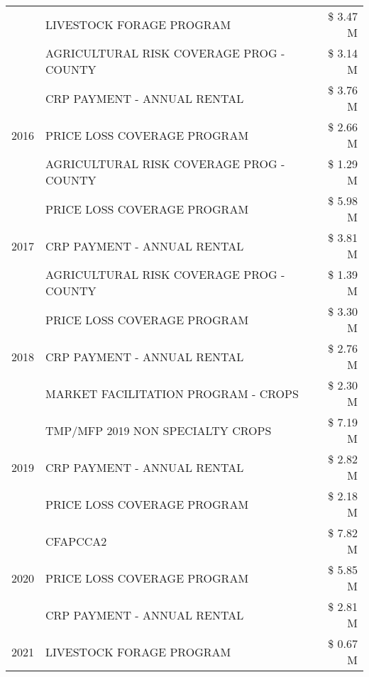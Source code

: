\begin{tabular}{llr}
 & LIVESTOCK FORAGE PROGRAM & \$ 3.47 M \\
 & AGRICULTURAL RISK COVERAGE PROG - COUNTY & \$ 3.14 M \\
\cline{1-3}
\multirow[t]{3}{*}{2016} & CRP PAYMENT - ANNUAL RENTAL & \$ 3.76 M \\
 & PRICE LOSS COVERAGE PROGRAM & \$ 2.66 M \\
 & AGRICULTURAL RISK COVERAGE PROG - COUNTY & \$ 1.29 M \\
\cline{1-3}
\multirow[t]{3}{*}{2017} & PRICE LOSS COVERAGE PROGRAM & \$ 5.98 M \\
 & CRP PAYMENT - ANNUAL RENTAL & \$ 3.81 M \\
 & AGRICULTURAL RISK COVERAGE PROG - COUNTY & \$ 1.39 M \\
\cline{1-3}
\multirow[t]{3}{*}{2018} & PRICE LOSS COVERAGE PROGRAM & \$ 3.30 M \\
 & CRP PAYMENT - ANNUAL RENTAL & \$ 2.76 M \\
 & MARKET FACILITATION PROGRAM - CROPS & \$ 2.30 M \\
\cline{1-3}
\multirow[t]{3}{*}{2019} & TMP/MFP 2019 NON SPECIALTY CROPS & \$ 7.19 M \\
 & CRP PAYMENT - ANNUAL RENTAL & \$ 2.82 M \\
 & PRICE LOSS COVERAGE PROGRAM & \$ 2.18 M \\
\cline{1-3}
\multirow[t]{3}{*}{2020} & CFAPCCA2 & \$ 7.82 M \\
 & PRICE LOSS COVERAGE PROGRAM & \$ 5.85 M \\
 & CRP PAYMENT - ANNUAL RENTAL & \$ 2.81 M \\
\cline{1-3}
2021 & LIVESTOCK FORAGE PROGRAM & \$ 0.67 M \\
\cline{1-3}
\bottomrule
\end{tabular}
